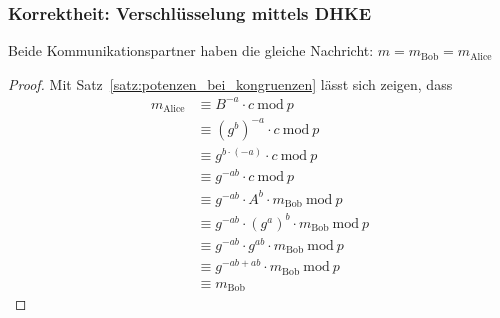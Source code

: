 \documentclass[
  a4paper,
  11pt,
]{scrartcl}
\theoremstyle{plain}
\theoremstyle{definition}
\theoremstyle{remark}
\newcommand{\Mod}[1]{\ \mathrm{mod}\ #1}
\begin{document}
\subsubsection{Korrektheit: Verschlüsselung mittels DHKE}
\label{sub:enc_with_dhke_proof}
Beide Kommunikationspartner haben die gleiche Nachricht: $m = m_{\text{Bob}} =
m_{\text{Alice}}$
\begin{proof}
	Mit Satz~\ref{satz:potenzen_bei_kongruenzen} lässt sich zeigen, dass
	\begin{align*}
      m_{\text{Alice}} & \equiv B^{-a} \cdot c \Mod{p}\\
      & \equiv (g^b)^{-a} \cdot c \Mod{p}\\
      & \equiv g^{b \cdot (-a)} \cdot c \Mod{p}\\
      & \equiv g^{-ab} \cdot c \Mod{p}\\
      & \equiv g^{-ab} \cdot A^b \cdot m_{\text{Bob}} \Mod{p}\\
      & \equiv g^{-ab} \cdot (g^a)^b \cdot m_{\text{Bob}} \Mod{p}\\
      & \equiv g^{-ab} \cdot g^{ab} \cdot m_{\text{Bob}} \Mod{p}\\
      & \equiv g^{-ab+ab} \cdot m_{\text{Bob}} \Mod{p}\\
      & \equiv m_{\text{Bob}}
    \end{align*}
\end{proof}
\end{document}
